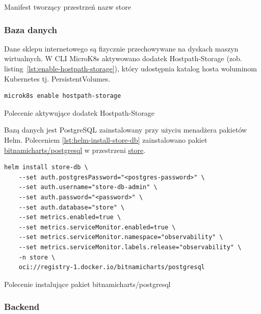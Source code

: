 \begin{listing}[H]
    \inputminted[xleftmargin=20pt,linenos]{yaml}{code/store-namespace.yaml}
    \caption{Manifest tworzący przestrzeń nazw store}
    \label{lst:store-namespace}
\end{listing}

\subsubsection{Baza danych}\label{subsubsec:baza-danych}

Dane sklepu internetowego są fizycznie przechowywane na dyskach maszyn wirtualnych.
W CLI MicroK8s aktywowano dodatek Hostpath-Storage (zob. listing~\ref{lst:enable-hostpath-storage}), który udostępnia katalog hosta woluminom Kubernetes tj. PersistentVolumes.

\begin{listing}[H]
    \begin{verbatim}
microk8s enable hostpath-storage
    \end{verbatim}
    \caption{Polecenie aktywujące dodatek Hostpath-Storage}
    \label{lst:enable-hostpath-storage}
\end{listing}

\noindent Bazą danych jest PostgreSQL zainstalowany przy użyciu menadżera pakietów Helm.
Poleceniem \autoref{lst:helm-install-store-db} zainstalowano pakiet \url{bitnamicharts/postgresql} w przestrzeni \url{store}.

\begin{listing}[H]
    \begin{verbatim}
helm install store-db \
    --set auth.postgresPassword="<postgres-password>" \
    --set auth.username="store-db-admin" \
    --set auth.password="<password>" \
    --set auth.database="store" \
    --set metrics.enabled=true \
    --set metrics.serviceMonitor.enabled=true \
    --set metrics.serviceMonitor.namespace="observability" \
    --set metrics.serviceMonitor.labels.release="observability" \
    -n store \
    oci://registry-1.docker.io/bitnamicharts/postgresql
    \end{verbatim}
    \caption{Polecenie instalujące pakiet bitnamicharts/postgresql}
    \label{lst:helm-install-store-db}
\end{listing}

\subsubsection{Backend}

